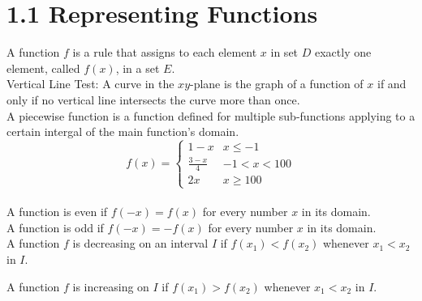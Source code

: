 %
%

\section*{1.1 Representing Functions}

A function \(f\) is a rule that assigns to each element \(x\) in set \(D\) exactly one element, called \(f(x)\), in a set \(E\).\\

Vertical Line Test: A curve in the \(xy\)-plane is the graph of a function of \(x\) if and only if no vertical line intersects the curve more than once.\\

A piecewise function is a function defined for multiple sub-functions applying to a certain intergal of the main function's domain.\\


\[ f(x)=
    \begin{cases} 
      1-x & x\leq -1 \\
      \frac{3-x}{4} & -1 < x < 100 \\
      2x & x\geq 100
   \end{cases}
\]\\

A function is even if \(f(-x)=f(x)\) for every number \(x\) in its domain.\\

A function is odd if \(f(-x)=-f(x)\) for every number \(x\) in its domain.\\

A function \(f\) is decreasing on an interval \(I\) if \(f(x_1)<f(x_2)\) whenever \(x_1 < x_2\) in \(I\).

A function \(f\) is increasing on \(I\) if \(f(x_1)>f(x_2)\) whenever \(x_1<x_2\) in \(I\).\\